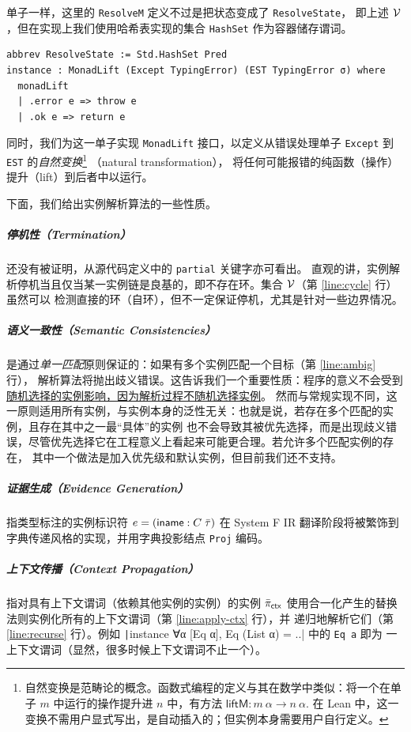 单子一样，这里的 \texttt{ResolveM} 定义不过是把状态变成了 \texttt{ResolveState}，
即上述 $\mathcal{V}$，但在实现上我们使用哈希表实现的集合 \texttt{HashSet} 作为容器储存谓词。
\begin{verbatim}
abbrev ResolveState := Std.HashSet Pred
instance : MonadLift (Except TypingError) (EST TypingError σ) where
  monadLift
  | .error e => throw e
  | .ok e => return e
\end{verbatim}
同时，我们为这一单子实现 \texttt{MonadLift} 接口，以定义从错误处理单子 \texttt{Except} 到 \texttt{EST} 的\emph{自然变换}\footnote{
  自然变换是范畴论的概念。函数式编程的定义与其在数学中类似：将一个在单子 $m$ 中运行的操作提升进 $n$ 中，有方法
  $\mathsf{liftM} : m\ \alpha\to n\ \alpha$. 在 Lean 中，这一变换不需用户显式写出，是自动插入的；但实例本身需要用户自行定义。
}
（natural transformation），
将任何可能报错的纯函数（操作）提升（lift）到后者中以运行。

\begin{property}
  下面，我们给出实例解析算法的一些性质。
  {\setlength{\parskip}{-1em}
    \subparagraph{停机性（Termination）} 还没有被证明，从源代码定义中的 \texttt{partial} 关键字亦可看出。
    直观的讲，实例解析停机当且仅当某一实例链是良基的，即不存在环。集合 $\mathcal{V}$（第 \ref{line:cycle} 行）虽然可以
    检测直接的环（自环），但不一定保证停机，尤其是针对一些边界情况。
    \subparagraph{语义一致性（Semantic Consistencies）} 是通过\emph{单一匹配}原则保证的：如果有多个实例匹配一个目标（第 \ref{line:ambig} 行），
    解析算法将抛出歧义错误。这告诉我们一个重要性质：程序的意义不会受到\underline{随机选择的实例影响，因为解析过程不随机选择实例}。
    然而与常规实现不同，这一原则适用所有实例，与实例本身的泛性无关：也就是说，若存在多个匹配的实例，且存在其中之一最“具体”的实例
    也不会导致其被优先选择，而是出现歧义错误，尽管优先选择它在工程意义上看起来可能更合理。若允许多个匹配实例的存在，
    其中一个做法是加入优先级和默认实例，但目前我们还不支持。
    \subparagraph{证据生成（Evidence Generation）} 指类型标注的实例标识符 $e = (\mathsf{iname} : C\;\bar{\tau})$
    在 System F IR 翻译阶段将被繁饰到字典传递风格的实现，并用字典投影结点 \texttt{Proj} 编码。
    \subparagraph{上下文传播（Context Propagation）} 指对具有上下文谓词（依赖其他实例的实例）的实例 $\bar{\pi}_{\mathsf{ctx}}$
    使用合一化产生的替换法则实例化所有的上下文谓词（第 \ref{line:apply-ctx} 行），并
    递归地解析它们（第 \ref{line:recurse} 行）。例如
    \texttt|instance ∀α [Eq α], Eq (List α) = ..| 中的 \texttt{Eq a} 即为
    一上下文谓词（显然，很多时候上下文谓词不止一个）。
  }
\end{property}

